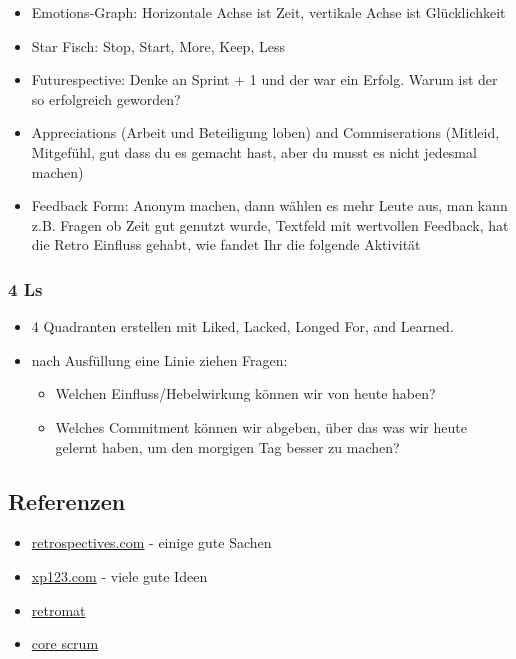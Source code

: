 \begin{itemize}
\begin{itemize}
    \end{itemize}
  \item Emotions-Graph: Horizontale Achse ist Zeit, vertikale Achse ist Glücklichkeit
  \item Star Fisch: Stop, Start, More, Keep, Less
  \item Futurespective: Denke an Sprint + 1 und der war ein Erfolg. Warum ist der so erfolgreich
    geworden?
  \item Appreciations (Arbeit und Beteiligung loben) and Commiserations (Mitleid, Mitgefühl, gut
    dass du es gemacht hast, aber du musst es nicht jedesmal machen)
  \item Feedback Form: Anonym machen, dann wählen es mehr Leute aus, man kann z.B. Fragen ob Zeit
    gut genutzt wurde, Textfeld mit wertvollen Feedback, hat die Retro Einfluss gehabt, wie
    fandet Ihr die folgende Aktivität
\end{itemize}

\subsubsection{4 Ls}

\begin{itemize}
  \item 4 Quadranten erstellen mit Liked, Lacked, Longed For, and Learned.
  \item nach Ausfüllung eine Linie ziehen Fragen:
    \begin{itemize}
      \item Welchen Einfluss/Hebelwirkung können wir von heute haben?
      \item Welches Commitment können wir abgeben, über das was wir heute gelernt haben, um den
        morgigen Tag besser zu machen?
    \end{itemize}
\end{itemize}


\subsection{Referenzen}
\begin{itemize}
  \item \href{http://retrospectives.com/}{retrospectives.com} - einige gute Sachen
  \item
    \href{http://xp123.com/articles/patterns-for-iteration-retrospectives/}{xp123.com} - viele
    gute Ideen
  \item \href{http://plans-for-retrospectives.com}{retromat}
  \item \href{https://www.scrumalliance.org/why-scrum/core-scrum-values-roles}{core scrum}
\end{itemize}
\pagebreak


